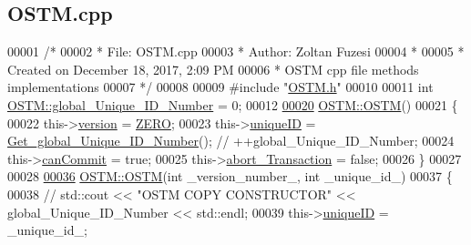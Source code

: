 \hypertarget{_o_s_t_m_8cpp_source}{}\subsection{O\+S\+T\+M.\+cpp}

\begin{DoxyCode}
00001 \textcolor{comment}{/* }
00002 \textcolor{comment}{ * File:   OSTM.cpp}
00003 \textcolor{comment}{ * Author: Zoltan Fuzesi}
00004 \textcolor{comment}{ * }
00005 \textcolor{comment}{ * Created on December 18, 2017, 2:09 PM}
00006 \textcolor{comment}{ * OSTM cpp file methods implementations}
00007 \textcolor{comment}{ */}
00008 
00009 \textcolor{preprocessor}{#include "\hyperlink{_o_s_t_m_8h}{OSTM.h}"}
00010 
00011 \textcolor{keywordtype}{int} \hyperlink{class_o_s_t_m_acb617b9666d198c0de333c8613df0d4b_acb617b9666d198c0de333c8613df0d4b}{OSTM::global\_Unique\_ID\_Number} = 0;
00012 
\hypertarget{_o_s_t_m_8cpp_source.tex_l00020}{}\hyperlink{class_o_s_t_m_a968edf778668bd0ec7603f0571619196_a968edf778668bd0ec7603f0571619196}{00020} \hyperlink{class_o_s_t_m_a968edf778668bd0ec7603f0571619196_a968edf778668bd0ec7603f0571619196}{OSTM::OSTM}()
00021 \{
00022     this->\hyperlink{class_o_s_t_m_a9a6ea36181be2db7f9082d77956511d7_a9a6ea36181be2db7f9082d77956511d7}{version} = \hyperlink{class_o_s_t_m_a0bb6ae8411d25f8e7b82d0a61729ea89_a0bb6ae8411d25f8e7b82d0a61729ea89}{ZERO};
00023     this->\hyperlink{class_o_s_t_m_aa9fe59368b701af7f70befa23bd6901a_aa9fe59368b701af7f70befa23bd6901a}{uniqueID} = \hyperlink{class_o_s_t_m_adee6903c1100e0d78640bd4b85e5d7df_adee6903c1100e0d78640bd4b85e5d7df}{Get\_global\_Unique\_ID\_Number}(); \textcolor{comment}{//
      ++global\_Unique\_ID\_Number;}
00024     this->\hyperlink{class_o_s_t_m_a2a5b89641af274ddc69bdf8c1c1a07d6_a2a5b89641af274ddc69bdf8c1c1a07d6}{canCommit} = \textcolor{keyword}{true};
00025     this->\hyperlink{class_o_s_t_m_a5121d9c4b08320b26beca82ba2f85c4a_a5121d9c4b08320b26beca82ba2f85c4a}{abort\_Transaction} = \textcolor{keyword}{false};
00026 \}
00027 
00028 
\hypertarget{_o_s_t_m_8cpp_source.tex_l00036}{}\hyperlink{class_o_s_t_m_a2314f55a127b94aa8a51d19ba798401e_a2314f55a127b94aa8a51d19ba798401e}{00036} \hyperlink{class_o_s_t_m_a968edf778668bd0ec7603f0571619196_a968edf778668bd0ec7603f0571619196}{OSTM::OSTM}(\textcolor{keywordtype}{int} \_version\_number\_, \textcolor{keywordtype}{int} \_unique\_id\_)
00037 \{
00038    \textcolor{comment}{// std::cout << "OSTM COPY CONSTRUCTOR" << global\_Unique\_ID\_Number << std::endl;}
00039     this->\hyperlink{class_o_s_t_m_aa9fe59368b701af7f70befa23bd6901a_aa9fe59368b701af7f70befa23bd6901a}{uniqueID} = \_unique\_id\_;

\end{DoxyCode}
